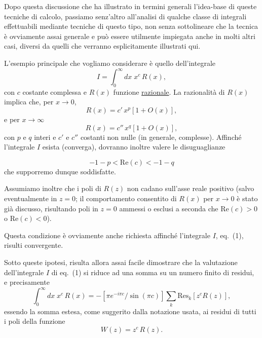 \documentclass[11pt, a4paper]{book}
\numberwithin{equation}{section}
\begin{document}
\medskip
Dopo questa discussione che ha illustrato in termini generali l'idea-base
di queste tecniche di calcolo, passiamo senz'altro all'analisi di qualche classe
di integrali effettuabili mediante tecniche di questo tipo, non senza sottolineare
che la tecnica è ovviamente assai generale e può essere utilmente impiegata anche
in molti altri casi, diversi da quelli che verranno esplicitamente illustrati qui.

L'esempio principale che vogliamo considerare è quello dell'integrale
\begin{equation}
    I = \int_0^\infty dx\; x^c\, R(x), \tag{1}
\end{equation}
con $c$ costante complessa e $R(x)$ funzione \uline{razionale}. La razionalità
di $R(x)$ implica che, per $x \to 0$,
\begin{equation}
    R(x) = c'\, x^p \left[1 + O(x)\right], \tag{2}
\end{equation}
e per $x \to \infty$
\begin{equation}
    R(x) = c''\, x^q \left[1 + O(x)\right], \tag{3}
\end{equation}
con $p$ e $q$ interi e $c'$ e $c''$ costanti non nulle (in generale, complesse).
Affinché l'integrale $I$ esista (converga), dovranno inoltre valere le disuguaglianze


\begin{equation}
    -1-p < \mathrm{Re}(c) < -1-q \tag{4}
\end{equation}
che supporremo dunque soddisfatte.

Assumiamo inoltre che i poli di $R(z)$ non cadano sull'asse reale positivo
(salvo eventualmente in $z=0$; il comportamento consentito di $R(x)$ per
$x \to 0$ è stato già discusso, risultando poli in $z=0$ ammessi o esclusi a
seconda che $\mathrm{Re}(c) > 0$ o $\mathrm{Re}(c) < 0$).

Questa condizione è ovviamente anche richiesta affinché l'integrale $I$,
eq.~(1), risulti convergente.

Sotto queste ipotesi, risulta allora assai facile dimostrare che la
valutazione dell'integrale $I$ di eq.~(1) si riduce ad una somma su un numero
finito di residui, e precisamente
\begin{equation}
    \int_0^\infty dx\; x^c\, R(x) = -\left[\pi e^{-i\pi c}/\sin(\pi c)\right]
    \sum_k \mathrm{Res}_k\!\left[z^c R(z)\right], \tag{5}
\end{equation}
essendo la somma estesa, come suggerito dalla notazione usata, ai residui di
tutti i poli della funzione
\begin{equation}
    W(z) = z^c\, R(z). \tag{6}
\end{equation}
\end{document}
